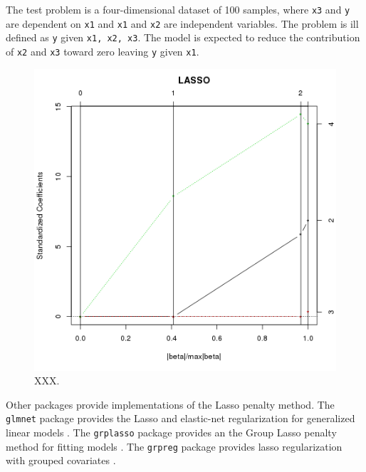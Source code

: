 The test problem is a four-dimensional dataset of 100 samples, where \texttt{x3} and \texttt{y} are dependent on \texttt{x1} and \texttt{x1} and \texttt{x2} are independent variables. The problem is ill defined as \texttt{y} given \texttt{x1, x2, x3}. The model is expected to reduce the contribution of \texttt{x2} and \texttt{x3} toward zero leaving \texttt{y} given \texttt{x1}.




\begin{figure}[htp]
\centering
\includegraphics[scale=0.60]{a_regularization/lasso_result.png}
\caption{XXX.}
\label{plot:lasso_result}
\end{figure}

Other packages provide implementations of the Lasso penalty method.
The \texttt{glmnet} package provides the Lasso and elastic-net regularization for generalized linear models \cite{Friedman2011}.
The \texttt{grplasso} package provides an the Group Lasso penalty method for fitting models \cite{Meier2009}.
The \texttt{grpreg} package provides lasso regularization with grouped covariates \cite{Brehen2011}.

